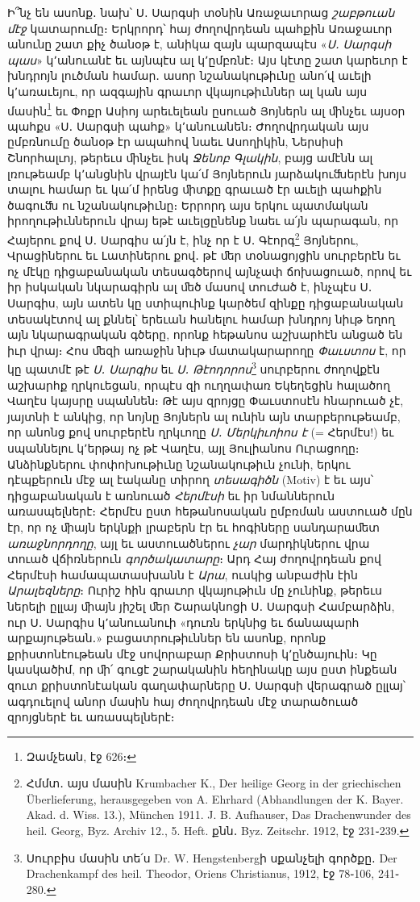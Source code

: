 \documentclass{article}
\begin{document}
{Ի՞նչ են ասոնք․ նախ՝ Ս․ Սարգսի տօնին Առաջաւորաց \emph{շաբթուան մէջ} կատարումը։ Երկրորդ՝ հայ ժողովրդեան պահքին Առաջաւոր անունը շատ քիչ ծանօթ է, անիկա զայն պարզապէս «\emph{Ս․ Սարգսի պաս}» կ՚անուանէ եւ այնպէս ալ կ՚ըմբռնէ։ Այս կէտը շատ կարեւոր է խնդրոյն լուծման համար․ ասոր նշանակութիւնը անո՛վ աւելի կ՚առաւեյու, որ ազգային գրաւոր վկայութիւններ ալ կան այս մասին\footnote{Զամչեան, էջ 626։} եւ Փոքր Ասիոյ արեւելեան ըսուած Յոյներն ալ ﬕնչեւ այսօր պահքս «Ս․ Սարգսի պահք» կ՚անուանեն։ Ժողովրդական այս ըմբռնումը ծանօթ էր ապահով նաեւ Ասողիկին, Ներսիսի Շնորհալւոյ, թերեւս ﬕնչեւ իսկ \emph{Ջենոբ Գլակին}, բայց ամէնն ալ լռութեամբ կ՚անցնին վրայէն կա՛մ Յոյներուն յարձակուﬓերէն խոյս տալու համար եւ կա՛մ իրենց ﬕտքը գրաւած էր աւելի պահքին ծագուﬓ ու նշանակութիւնը։ Երրորդ այս երկու պատմական իրողութիւններուն վրայ եթէ աւելցընենք նաեւ ա՛յն պարագան, որ Հայերու քով Ս․ Սարգիս ա՛յն է, ինչ որ է Ս․ Գէորգ\footnote{Հմմտ․ այս մասին Krumbacher K., Der heilige Georg in der griechischen Überlieferung, herausgegeben von A. Ehrhard (Abhandlungen der K. Bayer. Akad. d. Wiss. 13.), München 1911. J. B. Aufhauser, Das Drachenwunder des heil. Georg, Byz. Archiv 12., 5. Heft. քնն․ Byz. Zeitschr. 1912, էջ 231֊239.} Յոյներու, Վրացիներու եւ Լատիներու քով․ թէ ﬔր տօնացոյցին սուրբերէն եւ ոչ մէկը դիցաբանական տեսագծերով այնչափ ճոխացուած, որով եւ իր իսկական նկարագիրն ալ ﬔծ մասով տուժած է, ինչպէս Ս․ Սարգիս, այն ատեն կը ստիպուինք կարծեմ զինքը դիցաբանական տեսակէտով ալ քննել՝ երեւան հանելու համար խնդրոյ նիւթ եղող այն նկարագրական գծերը, որոնք հեթանոս աշխարհէն անցած են իւր վրայ։ Հոս ﬔզի առաջին նիւթ մատակարարողը \emph{Փաւստոս} է, որ կը պատմէ թէ \emph{Ս․ Սարգիս} եւ \emph{Ս․ Թէոդորոս}\footnote{Սուրբիս մասին տե՛ս Dr. W. Hengstenbergի սքանչելի գործքը․ Der Drachenkampf des heil. Theodor, Oriens Christianus, 1912, էջ 78֊106, 241֊280.} սուրբերու ժողովքէն աշխարհք ղրկուեցան, որպէս զի ուղղափառ Եկեղեցին հալածող Վաղէս կայսրը սպաննեն։ Թէ այս զրոյցը Փաւստոսէն հնարուած չէ, յայտնի է անկից, որ նոյնը Յոյներն ալ ունին այն տարբերութեամբ, որ անոնց քով սուրբերէն ղրկւողը \emph{Ս․ Մերկիւոիոս է} (= Հերմէս!) եւ սպաննելու կ՚երթայ ոչ թէ Վաղէս, այլ Յուլիանոս Ուրացողը։ Անձինքներու փոփոխութիւնը նշանակութիւն չունի, երկու դէպքերուն մէջ ալ էականը տիրող \emph{տեսագիծն} (Motiv) է եւ այս՝ դիցաբանական է առնուած \emph{Հերմէսի} եւ իր նմաններուն առասպելներէ։ Հերմէս ըստ հեթանոսական ըմբռման աստուած մըն էր, որ ոչ ﬕայն երկնքի լրաբերն էր եւ հոգիները սանդարաﬔտ \emph{առաջնորդողը}, այլ եւ աստուածներու \emph{չար} մարդիկներու վրա տուած վճիռներուն \emph{գործակատարը}։ Արդ Հայ ժողովրդեան քով Հերմէսի համապատասխանն է \emph{Արա}, ուսկից անբաժին էին \emph{Արալեզները}։ Ուրիշ հին գրաւոր վկայութիւն մը չունինք, թերեւս ներելի ըլլայ ﬕայն յիշել ﬔր Շարակնոցի Ս․ Սարգսի Համբարձին, ուր Ս․ Սարգիս կ՚անուանուի «դուռն երկնից եւ ճանապարհ արքայութեան․» բացատրութիւններ են ասոնք, որոնք քրիստոնէութեան մէջ սովորաբար Քրիստոսի կ՚ընծայուին։ Կը կասկածիմ, որ ﬕ՛ գուցէ շարականին հեղինակը այս ըստ ինքեան զուտ քրիստոնէական գաղափարները Ս․ Սարգսի վերագրած ըլլայ՝ ագդուելով անոր մասին հայ ժողովրդեան մէջ տարածուած զրոյցներէ եւ առասպելներէ։

}
\end{document}
